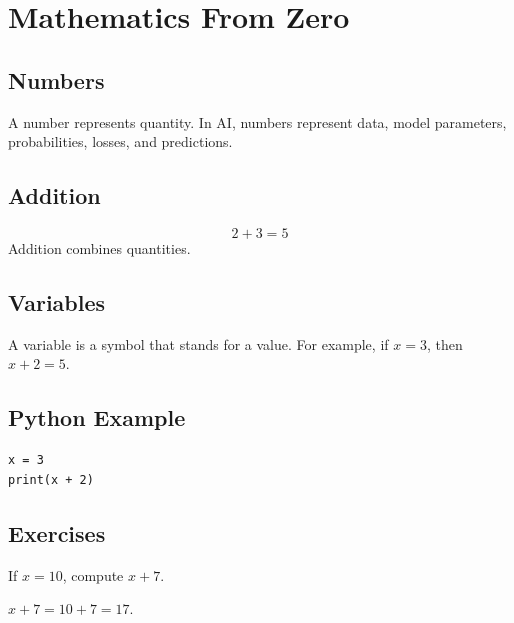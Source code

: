 \chapter{Mathematics From Zero}
\label{chap:math-from-zero}
\section{Numbers}A number represents quantity. In AI, numbers represent data, model parameters, probabilities, losses, and predictions.
\section{Addition}\[2+3=5\]
Addition combines quantities.
\section{Variables}A variable is a symbol that stands for a value. For example, if \(x=3\), then \(x+2=5\).
\section{Python Example}\begin{lstlisting}
x = 3
print(x + 2)
\end{lstlisting}
\section{Exercises}\begin{exercise}If \(x=10\), compute \(x+7\).\end{exercise}\begin{solution}\(x+7=10+7=17\).\end{solution}
